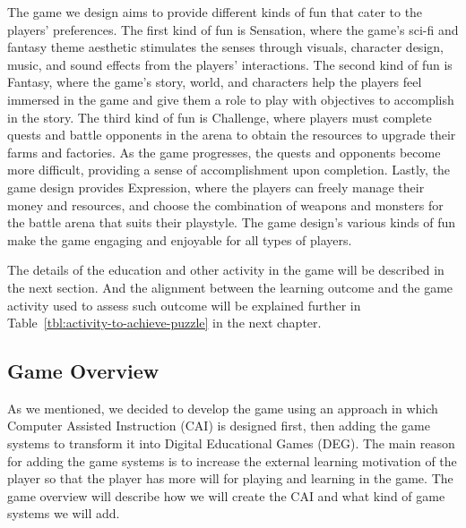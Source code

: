 \documentclass[12pt,oneside,openright,a4paper]{cpe-english-project}
\begin{document}
%
\hspace{2em}The game we design aims to provide different kinds of fun that cater to the players' preferences. The first kind of fun is Sensation, where the game's sci-fi and fantasy theme aesthetic stimulates the senses through visuals, character design, music, and sound effects from the players' interactions. The second kind of fun is Fantasy, where the game's story, world, and characters help the players feel immersed in the game and give them a role to play with objectives to accomplish in the story. The third kind of fun is Challenge, where players must complete quests and battle opponents in the arena to obtain the resources to upgrade their farms and factories. As the game progresses, the quests and opponents become more difficult, providing a sense of accomplishment upon completion. Lastly, the game design provides Expression, where the players can freely manage their money and resources, and choose the combination of weapons and monsters for the battle arena that suits their playstyle. The game design's various kinds of fun make the game engaging and enjoyable for all types of players.

\hspace{2em}The details of the education and other activity in the game will be described in the next section. And the alignment between the learning outcome and the game activity used to assess such outcome will be explained further in Table~\ref{tbl:activity-to-achieve-puzzle} in the next chapter.

\subsection{Game Overview}
	As we mentioned, we decided to develop the game using an approach in which Computer Assisted Instruction (CAI) is designed first, then adding the game systems to transform it into Digital Educational Games (DEG). The main reason for adding the game systems is to increase the external learning motivation of the player so that the player has more will for playing and learning in the game. The game overview will describe how we will create the CAI and what kind of game systems we will add.
\end{document}
